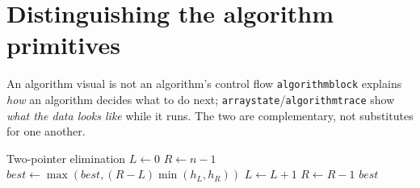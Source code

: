 \documentclass{reportkit}
\begin{document}
\section{Distinguishing the algorithm primitives}
\begin{principle}{An algorithm visual is not an algorithm's control flow}
\texttt{algorithmblock} explains \emph{how} an algorithm decides what to do
next; \texttt{arraystate}/\texttt{algorithmtrace} show \emph{what the data
looks like} while it runs. The two are complementary, not substitutes for
one another.
\end{principle}

\begin{algorithmblock}[label={alg:two-pointer-viz}]{Two-pointer elimination}
  \State $L \gets 0$
  \State $R \gets n-1$
    \State $best \gets \max(best,(R-L)\min(h_L,h_R))$
      \State $L \gets L+1$
    \Else
      \State $R \gets R-1$
    \EndIf
  \EndWhile
  \State \Return $best$
\end{algorithmblock}
\end{document}
